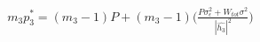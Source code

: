 \documentclass[preview]{standalone}
\begin{document}
\begin{align*}
m_3 p_3^\ast= \left(m_3 - 1\right) P + \left(m_3 - 1\right) \Bigg( \frac{P \sigma_\epsilon^2 + W_{tot} \sigma^2 }{ \left| \hat{h_3} \right| ^2 } \Bigg)
\end{align*}
\end{document}
